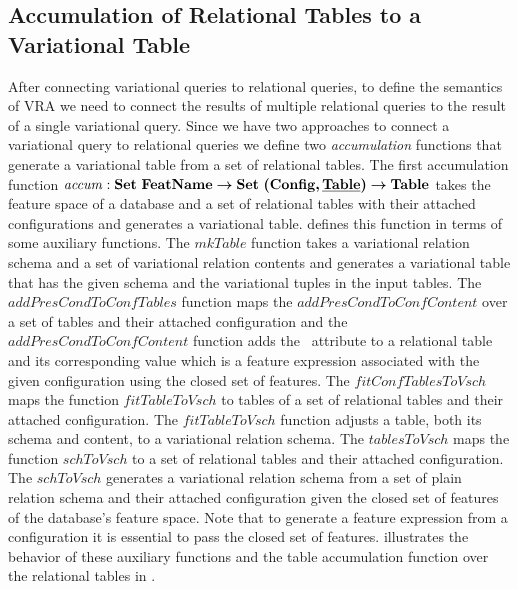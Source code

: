\subsection{Accumulation of Relational Tables to a Variational Table}
\label{sec:accum}

After connecting variational queries to relational queries, to define the 
semantics of VRA we need to connect
the results of multiple relational queries to the result of a single variational 
query. 
%
Since we have two approaches to connect a variational query to relational queries 
we define two \emph{accumulation} functions that generate a 
variational table from a set of relational tables. 
%
The first accumulation function $\mathit{accum} : \settype \fSet \totype \settype {\typepair \confSet \pTabSet} \totype \tabletype$ takes the feature space of a database and a set of relational
tables with their attached configurations and generates a variational table.  
defines this function in terms of some auxiliary functions. 
%
The $\mathit{mkTable}$ function takes a variational relation schema and a set of 
variational relation contents and generates a variational table that has the given schema
and the variational tuples in the input tables. 
%
The $\mathit{addPresCondToConfTables}$ function maps the $\mathit{addPresCondToConfContent}$
over a set of tables and their attached configuration and the  $\mathit{addPresCondToConfContent}$
function adds the \pcatt\ attribute to a relational table and its corresponding value which is 
a feature expression associated with the given configuration using the closed set of
features.
%
The $\mathit{fitConfTablesToVsch}$ maps the function $\mathit{fitTableToVsch}$ to tables of a set of 
relational tables and their attached configuration.
The $\mathit{fitTableToVsch}$ function adjusts a table, both its schema and content, 
to a variational relation schema.
%
The $\mathit{tablesToVsch}$ maps the function $\mathit{schToVsch}$ to a set of 
relational tables and their attached configuration. 
The $\mathit{schToVsch}$ generates a variational relation schema from a set of
plain relation schema and their attached configuration given the closed set of 
features of the database's feature space.
%
Note that to generate a feature expression from a configuration it is essential to
pass the closed set of features.
%
 illustrates the behavior of these auxiliary functions and the
table accumulation function over the relational tables in .



